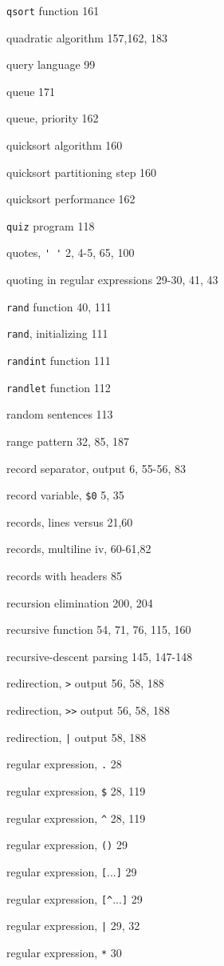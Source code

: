 \begin{multicols}{3}
\verb'qsort' function 161

quadratic algorithm 157,162, 183

query language 99

queue 171

queue, priority 162

quicksort algorithm 160

quicksort partitioning step 160

quicksort performance 162

\verb'quiz' program 118

quotes, \verb"' '" 2, 4-5, 65, 100

quoting in regular expressions 29-30, 41, 43

\verb'rand' function 40, 111

\verb'rand', initializing 111

\verb'randint' function 111

\verb'randlet' function 112

random sentences 113

range pattern 32, 85, 187

record separator, output 6, 55-56, 83

record variable, \verb'$0' 5, 35

records, lines versus 21,60

records, multiline iv, 60-61,82

records with headers 85

recursion elimination 200, 204

recursive function 54, 71, 76, 115, 160

recursive-descent parsing 145, 147-148

redirection, \verb'>' output 56, 58, 188

redirection, \verb'>>' output 56, 58, 188

redirection, \verb'|' output 58, 188

regular expression, \verb'.' 28

regular expression, \verb'$' 28, 119

regular expression, \verb'^' 28, 119

regular expression, \verb'()' 29

regular expression, \verb'['...\verb']' 29

regular expression, \verb'[^'...\verb']' 29

regular expression, \verb'|' 29, 32

regular expression, \verb'*' 30


\end{multicols}
